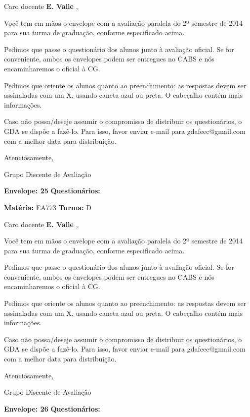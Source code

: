 \documentclass[a5paper]{letter}
\begin{document}
Caro docente {\bf E. Valle }, 

	Você tem em mãos o envelope com a avaliação paralela do 2º semestre de 2014 para sua turma de graduação, conforme especificado acima.

	Pedimos que passe o questionário dos alunos junto à avaliação oficial. Se for conveniente, ambos os envelopes podem ser entregues no CABS e nós encaminharemos o oficial à CG.

Pedimos que oriente os alunos quanto ao preenchimento: as respostas devem ser assinaladas com um X, usando caneta azul ou preta. O cabeçalho contém mais informações.

	Caso não possa/deseje assumir o compromisso de distribuir os questionários, o GDA se dispõe a fazê-lo. Para isso, favor enviar e-mail para gdafeec@gmail.com com a melhor data para distribuição.


Atenciosamente, 

Grupo Discente de Avaliação

\vspace{0.5cm}

{\bf Envelope: 25 }		\hfill	{\bf Questionários:} \hspace{2cm}

\newpage
\thispagestyle{empty}

\hfill {\bf Matéria:} EA773 {\bf Turma:} D

Caro docente {\bf E. Valle }, 

	Você tem em mãos o envelope com a avaliação paralela do 2º semestre de 2014 para sua turma de graduação, conforme especificado acima.

	Pedimos que passe o questionário dos alunos junto à avaliação oficial. Se for conveniente, ambos os envelopes podem ser entregues no CABS e nós encaminharemos o oficial à CG.

Pedimos que oriente os alunos quanto ao preenchimento: as respostas devem ser assinaladas com um X, usando caneta azul ou preta. O cabeçalho contém mais informações.

	Caso não possa/deseje assumir o compromisso de distribuir os questionários, o GDA se dispõe a fazê-lo. Para isso, favor enviar e-mail para gdafeec@gmail.com com a melhor data para distribuição.


Atenciosamente, 

Grupo Discente de Avaliação

\vspace{0.5cm}

{\bf Envelope: 26 }		\hfill	{\bf Questionários:} \hspace{2cm}
\end{document}
